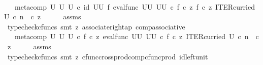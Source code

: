\begin{isabellebody}
\ \ \isamarkupfalse%
\ \isamarkupfalse%
\ {\isachardoublequoteopen}{\isachardot}{\kern0pt}{\isachardot}{\kern0pt}{\isachardot}{\kern0pt}\ {\isacharequal}{\kern0pt}\ meta{\isacharunderscore}{\kern0pt}comp\ U\ U\ U\ {\isasymcirc}\isactrlsub c\ {\isacharparenleft}{\kern0pt}id\ {\isacharparenleft}{\kern0pt}U\isactrlbsup U\isactrlesup {\isacharparenright}{\kern0pt}\ {\isasymtimes}\isactrlsub f\ eval{\isacharunderscore}{\kern0pt}func\ {\isacharparenleft}{\kern0pt}U\isactrlbsup U\isactrlesup {\isacharparenright}{\kern0pt}\ {\isacharparenleft}{\kern0pt}U\isactrlbsup U\isactrlesup {\isacharparenright}{\kern0pt}{\isacharparenright}{\kern0pt}\ {\isasymcirc}\isactrlsub c\ {\isasymlangle}f\ {\isasymcirc}\isactrlsub c\ z{\isacharcomma}{\kern0pt}\ {\isasymlangle}f\ {\isasymcirc}\isactrlsub c\ z{\isacharcomma}{\kern0pt}\ ITER{\isacharunderscore}{\kern0pt}curried\ U\ {\isasymcirc}\isactrlsub c\ {\isacharparenleft}{\kern0pt}n\ \ {\isasymcirc}\isactrlsub c\ z{\isacharparenright}{\kern0pt}{\isasymrangle}{\isasymrangle}{\isachardoublequoteclose}\isanewline
\ \ \ \ \isamarkupfalse%
\ assms\ \isamarkupfalse%
\ {\isacharparenleft}{\kern0pt}typecheck{\isacharunderscore}{\kern0pt}cfuncs{\isacharcomma}{\kern0pt}\ smt\ {\isacharparenleft}{\kern0pt}z{}{\isacharparenright}{\kern0pt}\ associate{\isacharunderscore}{\kern0pt}right{\isacharunderscore}{\kern0pt}ap\ comp{\isacharunderscore}{\kern0pt}associative{}{\isacharparenright}{\kern0pt}\isanewline
\ \ \isamarkupfalse%
\ \isamarkupfalse%
\ {\isachardoublequoteopen}{\isachardot}{\kern0pt}{\isachardot}{\kern0pt}{\isachardot}{\kern0pt}\ {\isacharequal}{\kern0pt}\ meta{\isacharunderscore}{\kern0pt}comp\ U\ U\ U\ {\isasymcirc}\isactrlsub c\ {\isasymlangle}f\ {\isasymcirc}\isactrlsub c\ z{\isacharcomma}{\kern0pt}\ eval{\isacharunderscore}{\kern0pt}func\ {\isacharparenleft}{\kern0pt}U\isactrlbsup U\isactrlesup {\isacharparenright}{\kern0pt}\ {\isacharparenleft}{\kern0pt}U\isactrlbsup U\isactrlesup {\isacharparenright}{\kern0pt}\ {\isasymcirc}\isactrlsub c\ {\isasymlangle}f\ {\isasymcirc}\isactrlsub c\ z{\isacharcomma}{\kern0pt}\ ITER{\isacharunderscore}{\kern0pt}curried\ U\ {\isasymcirc}\isactrlsub c\ {\isacharparenleft}{\kern0pt}n\ \ {\isasymcirc}\isactrlsub c\ z{\isacharparenright}{\kern0pt}{\isasymrangle}{\isasymrangle}{\isachardoublequoteclose}\isanewline
\ \ \ \ \isamarkupfalse%
\ assms\ \isamarkupfalse%
\ {\isacharparenleft}{\kern0pt}typecheck{\isacharunderscore}{\kern0pt}cfuncs{\isacharcomma}{\kern0pt}\ smt\ {\isacharparenleft}{\kern0pt}z{}{\isacharparenright}{\kern0pt}\ cfunc{\isacharunderscore}{\kern0pt}cross{\isacharunderscore}{\kern0pt}prod{\isacharunderscore}{\kern0pt}comp{\isacharunderscore}{\kern0pt}cfunc{\isacharunderscore}{\kern0pt}prod\ id{\isacharunderscore}{\kern0pt}left{\isacharunderscore}{\kern0pt}unit{}{\isacharparenright}{\kern0pt}\isanewline

\end{isabellebody}
